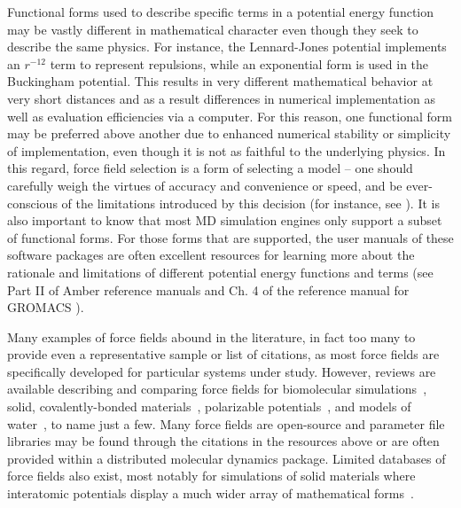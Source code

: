 \documentclass[9pt,bestpractices]{livecoms}
\begin{document}
Functional forms used to describe specific terms in a potential energy function may be vastly different in mathematical character even though they seek to describe the same physics.
For instance, the Lennard-Jones potential implements an $r^{-12}$ term to represent repulsions, while an exponential form is used in the Buckingham potential.
This results in very different mathematical behavior at very short distances and as a result differences in numerical implementation as well as evaluation efficiencies via a computer.
For this reason, one functional form may be preferred above another due to  enhanced numerical stability or simplicity of implementation, even though it is not as faithful to the underlying physics.
In this regard, force field selection is a form of selecting a model -- one should carefully weigh the virtues of accuracy and convenience or speed, and be ever-conscious of the limitations introduced by this decision (for instance, see \citet{Becker2013}).
It is also important to know that most MD simulation engines only support a subset of functional forms.
For those forms that are supported, the user manuals of these software packages are often excellent resources for learning more about the rationale and limitations of different potential energy functions and terms (see Part II of Amber reference manuals\citep{AmberManual} and Ch. 4 of the reference manual for GROMACS \citep{GROMACSManual}).

Many examples of force fields abound in the literature, in fact too many to provide even a representative sample or list of citations, as most force fields are specifically developed for particular systems under study.
However, reviews are available describing and comparing force fields for biomolecular simulations~\citep{Ponder2003, Riniker2018}, solid, covalently-bonded materials~\citep{Mishra2017}, polarizable potentials~\citep{Lopes2009}, and models of water~\citep{Onufriev2018, Vega2011}, to name just a few. 
Many force fields are open-source and parameter file libraries may be found through the citations in the resources above or are often provided within a distributed molecular dynamics package. 
Limited databases of force fields also exist, most notably for simulations of solid materials where interatomic potentials display a much wider array of mathematical forms~\citep{openKIM, IPRnist}.
\end{document}
